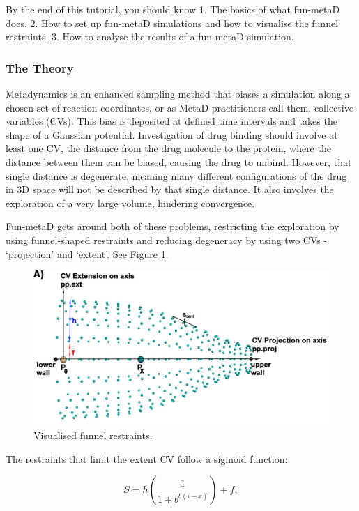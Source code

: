By the end of this tutorial, you should know 1. The basics of what
fun-metaD does. 2. How to set up fun-metaD simulations and how to
visualise the funnel restraints. 3. How to analyse the results of a
fun-metaD simulation.

\hypertarget{the-theory}{%
\subsubsection{The Theory}\label{the-theory}}

Metadynamics is an enhanced sampling method that biases a simulation
along a chosen set of reaction coordinates, or as MetaD practitioners
call them, collective variables (CVs). This bias is deposited at defined
time intervals and takes the shape of a Gaussian potential.
Investigation of drug binding should involve at least one CV, the distance
from the drug molecule to the protein, where the distance between them
can be biased, causing the drug to unbind. However, that single distance
is degenerate, meaning many different configurations of the drug in 3D
space will not be described by that single distance. It also involves
the exploration of a very large volume, hindering convergence.

Fun-metaD gets around both of these problems, restricting the
exploration by using funnel-shaped restraints and reducing degeneracy by
using two CVs - `projection' and `extent'. See Figure \ref{fig:funnel}.

\begin{figure}[htp]
\includegraphics[width=\linewidth]{LIVECOMS/02_funnel_metad/funmetadfig1.jpeg}
\caption{Visualised funnel restraints.}
\label{fig:funnel}
\end{figure}

The restraints that limit the extent CV follow a sigmoid function:

\begin{equation}
S = h\left(\frac{1}{1+b^{b(i-x)}}\right) + f,
\end{equation}

